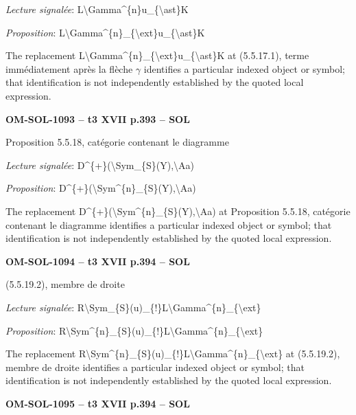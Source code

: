 \emph{Lecture signalée}: L\textbackslash{}Gamma\textasciicircum{}\{n\}u\_\{\textbackslash{}ast\}K\par
\emph{Proposition}: L\textbackslash{}Gamma\textasciicircum{}\{n\}\_\{\textbackslash{}ext\}u\_\{\textbackslash{}ast\}K\par
The replacement L\textbackslash{}Gamma\textasciicircum{}\{n\}\_\{\textbackslash{}ext\}u\_\{\textbackslash{}ast\}K at (5.5.17.1), terme immédiatement après la flèche \ensuremath{\gamma} identifies a particular indexed object or symbol; that identification is not independently established by the quoted local expression.\par
\par\noindent\textbf{OM-SOL-1093 -- t3 XVII p.393 -- SOL}\par
Proposition 5.5.18, catégorie contenant le diagramme\par
\emph{Lecture signalée}: D\textasciicircum{}\{+\}(\textbackslash{}Sym\_\{S\}(Y),\textbackslash{}Aa)\par
\emph{Proposition}: D\textasciicircum{}\{+\}(\textbackslash{}Sym\textasciicircum{}\{n\}\_\{S\}(Y),\textbackslash{}Aa)\par
The replacement D\textasciicircum{}\{+\}(\textbackslash{}Sym\textasciicircum{}\{n\}\_\{S\}(Y),\textbackslash{}Aa) at Proposition 5.5.18, catégorie contenant le diagramme identifies a particular indexed object or symbol; that identification is not independently established by the quoted local expression.\par
\par\noindent\textbf{OM-SOL-1094 -- t3 XVII p.394 -- SOL}\par
(5.5.19.2), membre de droite\par
\emph{Lecture signalée}: R\textbackslash{}Sym\_\{S\}(u)\_\{!\}L\textbackslash{}Gamma\textasciicircum{}\{n\}\_\{\textbackslash{}ext\}\par
\emph{Proposition}: R\textbackslash{}Sym\textasciicircum{}\{n\}\_\{S\}(u)\_\{!\}L\textbackslash{}Gamma\textasciicircum{}\{n\}\_\{\textbackslash{}ext\}\par
The replacement R\textbackslash{}Sym\textasciicircum{}\{n\}\_\{S\}(u)\_\{!\}L\textbackslash{}Gamma\textasciicircum{}\{n\}\_\{\textbackslash{}ext\} at (5.5.19.2), membre de droite identifies a particular indexed object or symbol; that identification is not independently established by the quoted local expression.\par
\par\noindent\textbf{OM-SOL-1095 -- t3 XVII p.394 -- SOL}\par
